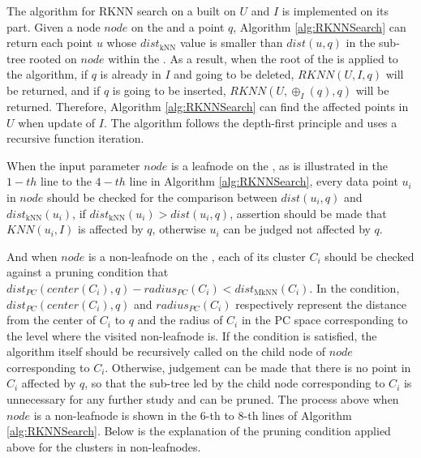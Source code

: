 \begin{algorithm}[t]
\caption{RKNN\_\dualtree($node$, $q$)}\label{alg:RKNNSearch}

\end{algorithm}

The algorithm for RKNN search on a \dualtree built on $U$ and $I$ is implemented on its \hdrtree part. Given a node $node$ on the \hdrtree and a point $q$, Algorithm \ref{alg:RKNNSearch} can return each point $u$ whose $dist_\text{kNN}$ value is smaller than $dist(u,q)$ in the sub-tree rooted on $node$ within the \hdrtree. As a result, when the root of the \hdrtree is applied to the algorithm, if $q$ is already in $I$ and going to be deleted, $RKNN(U,I,q)$ will be returned, and if $q$ is going to be inserted, $RKNN(U,\oplus_{I}(q), q)$ will be returned. Therefore, Algorithm \ref{alg:RKNNSearch} can find the affected points in $U$ when update of $I$. The algorithm follows the depth-first principle and uses a recursive function iteration. 

When the input parameter $node$ is a leafnode on the \hdrtree, as is illustrated in the $1-th$ line to the $4-th$ line in Algorithm \ref{alg:RKNNSearch}, every data point $u_i$ in $node$ should be checked for the comparison between $dist(u_i,q)$ and $dist_\text{kNN}(u_i)$, if $dist_\text{kNN}(u_i)>dist(u_i,q)$, assertion should be made that $KNN(u_i, I)$ is affected by $q$, otherwise $u_i$ can be judged not affected by $q$. 

And when $node$ is a non-leafnode on the \hdrtree, each of its cluster $C_i$ should be checked against a pruning condition that $dist_{PC}(center(C_i), q) - radius_{PC}(C_i) < dist_\text{MkNN}(C_i)$. In the condition, $dist_{PC}(center(C_i),q)$ and $radius_{PC}(C_i)$ respectively represent the distance from the center of $C_i$ to $q$ and the radius of $C_i$ in the PC space corresponding to the level where the visited non-leafnode is. If the condition is satisfied, the algorithm itself should be recursively called on the child node of $node$ corresponding to $C_{i}$. Otherwise, judgement can be made that there is no point in $C_i$ affected by $q$, so that the sub-tree led by the child node corresponding to $C_i$ is unnecessary for any further study and can be pruned. The process above when $node$ is a non-leafnode is shown in the $6$-th to $8$-th lines of Algorithm \ref{alg:RKNNSearch}. Below is the explanation of the pruning condition applied above for the clusters in non-leafnodes. 

